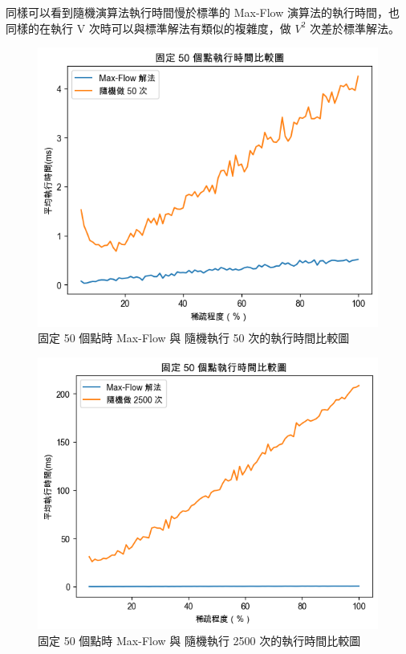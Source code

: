\documentclass[12pt]{article}
\begin{document}
	同樣可以看到隨機演算法執行時間慢於標準的 Max-Flow 演算法的執行時間，也同樣的在執行 V 次時可以與標準解法有類似的複雜度，做 $V^2$ 次差於標準解法。
	
	\begin{figure}[H]
		\centering
		\includegraphics[width=1\textwidth]{img/img3}
		\caption{固定 50 個點時 Max-Flow 與 隨機執行 50 次的執行時間比較圖}
		\label{Fig.3}
	\end{figure}	

	\begin{figure}[H]
		\centering
		\includegraphics[width=1\textwidth]{img/img4}
		\caption{固定 50 個點時 Max-Flow 與 隨機執行 2500 次的執行時間比較圖}
		\label{Fig.4}
	\end{figure}
	
\end{document}
